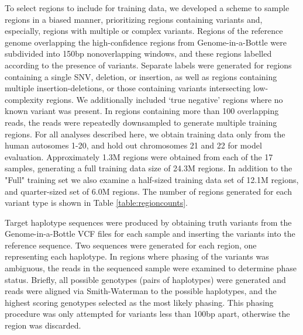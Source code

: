 \documentclass[]{article}
\begin{document}
To select regions to include for training data, we developed a scheme to sample regions in a biased manner, prioritizing regions containing variants and, especially, regions with multiple or complex variants. Regions of the reference genome overlapping the high-confidence regions from Genome-in-a-Bottle were subdivided into 150bp nonoverlapping windows, and these regions labelled according to the presence of variants. Separate labels were generated for regions containing a single SNV, deletion, or insertion, as well as regions containing multiple insertion-deletions, or those containing variants intersecting low-complexity regions. We additionally included `true negative' regions where no known variant was present. In regions containing more than 100 overlapping reads, the reads were repeatedly downsampled to generate multiple training regions. For all analyses described here, we obtain training data only from the human autosomes 1-20, and hold out chromosomes 21 and 22 for model evaluation. Approximately 1.3M regions were obtained from each of the 17 samples, generating a full training data size of 24.3M regions. In addition to the "Full" training set we also examine a half-sized training data set of 12.1M regions, and quarter-sized set of 6.0M regions. The number of regions generated for each variant type is shown in Table \ref{table:regioncounts}. 

Target haplotype sequences were produced by obtaining truth variants from the Genome-in-a-Bottle VCF files for each sample and inserting the variants into the reference sequence. Two sequences were generated for each region, one representing each haplotype. In regions where phasing of the variants was ambiguous, the reads in the sequenced sample were examined to determine phase status. Briefly, all possible genotypes (pairs of haplotypes) were generated and reads were aligned via Smith-Waterman to the possible haplotypes, and the highest scoring genotypes selected as the most likely phasing. This phasing procedure was only attempted for variants less than 100bp apart, otherwise the region was discarded.
\end{document}
